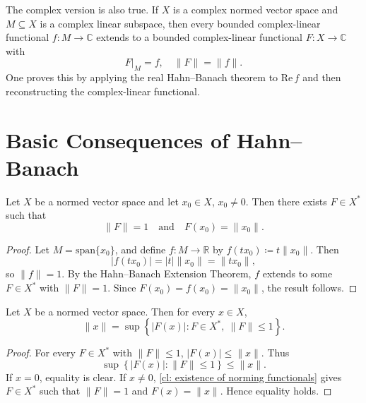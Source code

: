\begin{remark}
    The complex version is also true. If \(X\) is a complex normed vector space and \(M \subseteq X\) is a complex linear subspace, then every bounded complex-linear functional \(f : M \to \mathbb{C}\) extends to a bounded complex-linear functional \(F : X \to \mathbb{C}\) with
    \[
        F\vert_M = f, \quad \lVert F \rVert = \lVert f \rVert.
    \]
    One proves this by applying the real Hahn--Banach theorem to \(\mathrm{Re}\, f\) and then reconstructing the complex-linear functional.
\end{remark}

\section{Basic Consequences of Hahn--Banach}

\begin{corollary} \label{cl: existence of norming functionals}
    Let \(X\) be a normed vector space and let \(x_0 \in X\), \(x_0 \neq 0\). Then there exists \(F \in X^*\) such that
    \[
        \lVert F \rVert = 1 \quad \text{and} \quad F(x_0) = \lVert x_0 \rVert.
    \]
\end{corollary}

\begin{proof}
    Let \(M = \mathrm{span}\{x_0\}\), and define \(f : M \to \mathbb{R}\) by \(f(tx_0) \coloneqq t \lVert x_0 \rVert\). Then
    \[
        \vert f(tx_0) \vert = \vert t \vert \lVert x_0 \rVert = \lVert tx_0 \rVert,
    \]
    so \(\lVert f \rVert = 1\). By the Hahn--Banach Extension Theorem, \(f\) extends to some \(F \in X^*\) with \(\lVert F \rVert = 1\). Since \(F(x_0) = f(x_0) = \lVert x_0 \rVert\), the result follows.
\end{proof}

\begin{corollary} \label{cl: dual norm formula}
    Let \(X\) be a normed vector space. Then for every \(x \in X\),
    \[
        \lVert x \rVert = \sup\!\left\{ \vert F(x) \vert : F \in X^*,\ \lVert F \rVert \leq 1 \right\}.
    \]
\end{corollary}

\begin{proof}
    For every \(F \in X^*\) with \(\lVert F \rVert \leq 1\), \(\vert F(x) \vert \leq \lVert x \rVert\). Thus
    \[
        \sup\!\left\{ \vert F(x) \vert : \lVert F \rVert \leq 1 \right\} \leq \lVert x \rVert.
    \]
    If \(x = 0\), equality is clear. If \(x \neq 0\), \autoref{cl: existence of norming functionals} gives \(F \in X^*\) such that \(\lVert F \rVert = 1\) and \(F(x) = \lVert x \rVert\). Hence equality holds.
\end{proof}

